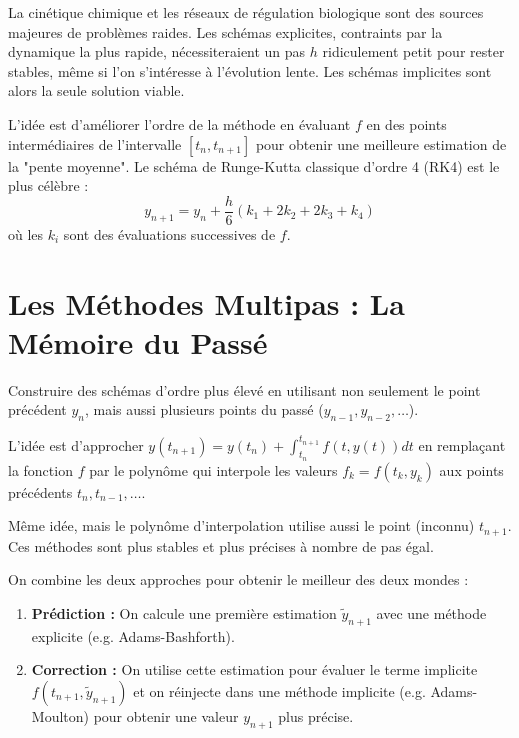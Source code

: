 \begin{application}
    La cinétique chimique et les réseaux de régulation biologique sont des sources majeures de problèmes raides. Les schémas explicites, contraints par la dynamique la plus rapide, nécessiteraient un pas $h$ ridiculement petit pour rester stables, même si l'on s'intéresse à l'évolution lente. Les schémas implicites sont alors la seule solution viable.
\end{application}

\begin{definition}
    L'idée est d'améliorer l'ordre de la méthode en évaluant $f$ en des points intermédiaires de l'intervalle $[t_n, t_{n+1}]$ pour obtenir une meilleure estimation de la "pente moyenne".
    Le schéma de Runge-Kutta classique d'ordre 4 (RK4) est le plus célèbre :
    $$ y_{n+1} = y_n + \frac{h}{6}(k_1 + 2k_2 + 2k_3 + k_4) $$
    où les $k_i$ sont des évaluations successives de $f$.
\end{definition}

\section{Les Méthodes Multipas : La Mémoire du Passé}

\begin{objectif}
    Construire des schémas d'ordre plus élevé en utilisant non seulement le point précédent $y_n$, mais aussi plusieurs points du passé ($y_{n-1}, y_{n-2}, \dots$).
\end{objectif}

\begin{definition}
    L'idée est d'approcher $y(t_{n+1}) = y(t_n) + \int_{t_n}^{t_{n+1}} f(t, y(t)) dt$ en remplaçant la fonction $f$ par le polynôme qui interpole les valeurs $f_k = f(t_k, y_k)$ aux points précédents $t_n, t_{n-1}, \dots$.
\end{definition}

\begin{definition}
    Même idée, mais le polynôme d'interpolation utilise aussi le point (inconnu) $t_{n+1}$. Ces méthodes sont plus stables et plus précises à nombre de pas égal.
\end{definition}

\begin{definition}
    On combine les deux approches pour obtenir le meilleur des deux mondes :
    \begin{enumerate}
        \item \textbf{Prédiction :} On calcule une première estimation $\tilde{y}_{n+1}$ avec une méthode explicite (e.g. Adams-Bashforth).
        \item \textbf{Correction :} On utilise cette estimation pour évaluer le terme implicite $f(t_{n+1}, \tilde{y}_{n+1})$ et on réinjecte dans une méthode implicite (e.g. Adams-Moulton) pour obtenir une valeur $y_{n+1}$ plus précise.
    \end{enumerate}
\end{definition}

